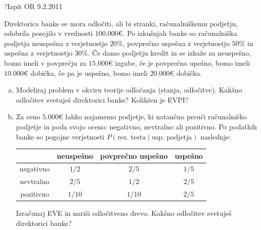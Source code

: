 \begin{naloga}{?}{Izpit OR 9.2.2011}
\begin{vprasanje}
Direktorica banke se mora odločiti, ali bi stranki, računalniškemu podjetju,
odobrila posojilo v vrednosti $100.000 €$.
Po izkušnjah banke so računalniška podjetja neuspešna z verjetnostjo $20 \%$,
povprečno uspešna z verjetnostjo $50 \%$ in uspešna z verjetnostjo $30 \%$.
Če damo podjetju kredit in se izkaže za neuspešno,
bomo imeli v povprečju za $15.000 €$ izgube,
če je povprečno upešno, bomo imeli $10.000 €$ dobička,
če pa je uspešno, bomo imeli $20.000 €$ dobička.
\begin{enumerate}[(a)]
\item Modeliraj problem v okviru teorije odločanja (stanja, odločitve).
Kakšno odločitev svetuješ direktorici banke?
Kolikšen je EVPI?

\item Za ceno $5.000 €$ lahko najamemo podjetje,
ki natančno preuči računalniško podjetje in poda svojo oceno:
negativno, nevtralno ali pozitivno.
Po podatkih banke so pogojne verjetnosti
$P(\text{rez.~testa} \;|\; \text{usp.~podjetja})$ naslednje:
\begin{center}
\begin{tabular}{c|ccc}
& neuspešno & povprečno uspešno & uspešno \\ \hline
negativno & $1/2$  & $2/5$  & $1/5$ \\
nevtralno & $2/5$  & $1/2$  & $2/5$ \\
pozitivno & $1/10$ & $1/10$ & $2/5$
\end{tabular}
\end{center}
Izračunaj EVE in nariši odločitveno drevo.
Kakšno odločitev svetuješ direktorici banke?
\end{enumerate}
\end{vprasanje}
\begin{odgovor}
\end{odgovor}
\end{naloga}



